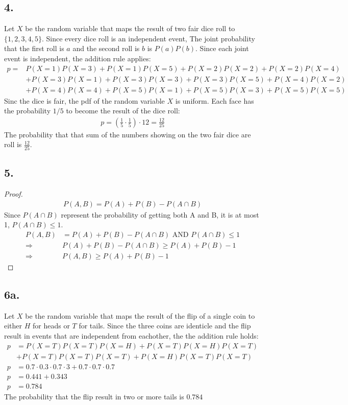 \documentclass{article}
\begin{document}
\subsection*{4.}
Let $X$ be the random variable that maps the result of two fair dice roll to
$\{1, 2, 3, 4, 5\}$. Since every dice roll is an independent event, The joint
probability that the first roll is $a$ and the second roll is $b$ is $P(a)P(b)$.
Since each joint event is independent, the addition rule applies:
\begin{align*}
p=& P(X=1)P(X=3) + P(X=1)P(X=5) + P(X=2)P(X=2) + P(X=2)P(X=4) \\
&+ P(X=3)P(X=1) + P(X=3)P(X=3) + P(X=3)P(X=5) + P(X=4)P(X=2) \\
&+ P(X=4)P(X=4) + P(X=5)P(X=1) + P(X=5)P(X=3) + P(X=5)P(X=5)
\end{align*}
Sinc the dice is fair, the pdf of the random variable $X$ is uniform. Each face
has the probability $1/5$ to become the result of the dice roll:
\begin{align*}
	p = (\frac{1}{5} \cdot \frac{1}{5}) \cdot 12 = \frac{12}{25}
\end{align*}
The probability that that sum of the numbers showing on the two fair dice are
roll is $\frac{12}{25}$.

\subsection*{5.}
\begin{proof}
\begin{align*}
	P(A, B) = P(A) + P(B) - P(A\cap B)
\end{align*}
Since $P(A\cap B)$ represent the probability of getting both A and B, it is
at most 1, $P(A\cap B) \le 1$.
\begin{align*}
	P(A, B) &= P(A) + P(B) - P(A\cap B) \text{ AND } P(A\cap B) \le 1 \\
	\Rightarrow &P(A) + P(B) - P(A\cap B) \ge P(A) + P(B) - 1 \\
	\Rightarrow &P(A, B) \ge P(A) + P(B) - 1
\end{align*}
\end{proof}

\subsection*{6a.}
Let $X$ be the random variable that maps the result of the flip of a single coin
to either $H$ for heads or $T$ for tails.
Since the three coins are identicle and the flip result in events that are
independent from eachother, the the addition rule holds:
\begin{align*}
p &= P(X = T)P(X = T)P(X = H) + P(X = T)P(X = H)P(X = T) \\
&+ P(X = T)P(X = T)P(X = T) + P(X = H)P(X = T)P(X = T) \\
p &= 0.7\cdot 0.3\cdot 0.7 \cdot 3 + 0.7\cdot 0.7\cdot 0.7 \\
p &= 0.441 + 0.343 \\
p &= 0.784
\end{align*}
The probability that the flip result in two or more tails is $0.784$
\end{document}
